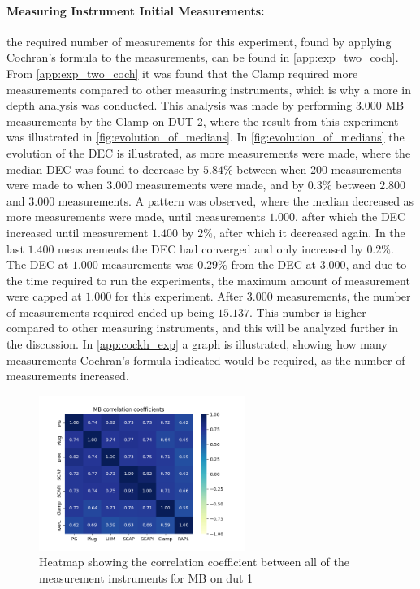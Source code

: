 \paragraph{Measuring Instrument Initial Measurements:} the required number of measurements for this experiment, found by applying Cochran's formula to the measurements, can be found in \cref{app:exp_two_coch}. %
From \cref{app:exp_two_coch} it was found that the Clamp required more measurements compared to other measuring instruments, which is why a more in depth analysis was conducted. This analysis was made by performing $3.000$ MB measurements by the Clamp on DUT 2, where the result from this experiment was illustrated in \cref{fig:evolution_of_medians}. In \cref{fig:evolution_of_medians} the evolution of the DEC is illustrated, as more measurements were made, where the median DEC was found to decrease by $5.84\%$ between when $200$ measurements were made to when $3.000$ measurements were made, and by $0.3\%$ between $2.800$ and $3.000$ measurements. A pattern was observed, where the median decreased as more measurements were made, until measurements $1.000$, after which the DEC increased until measurement $1.400$ by $2\%$, after which it decreased again. In the last $1.400$ measurements the DEC had converged and only increased by $0.2\%$. The DEC at $1.000$ measurements was $0.29\%$ from the DEC at $3.000$, and due to the time required to run the experiments, the maximum amount of measurement were capped at $1.000$ for this experiment. After $3.000$ measurements, the number of measurements required ended up being $15.137$. This number is higher compared to other measuring instruments, and this will be analyzed further in the discussion. In \cref{app:cockh_exp} a graph is illustrated, showing how many measurements Cochran's formula indicated would be required, as the number of measurements increased. 



\begin{figure}[H]
    \centering
    \hspace*{-1cm} %
    \includegraphics[width=0.6\textwidth]{figures/MandelbrotDut1.png}
    \caption{Heatmap showing the correlation coefficient between all of the measurement instruments for MB on dut 1}
    \label{fig:mandelCorrDut1}
\end{figure}

